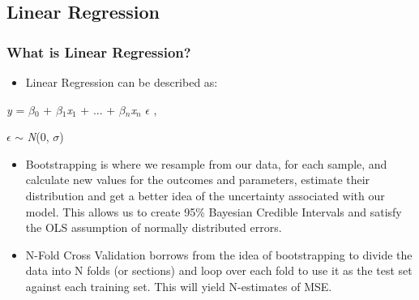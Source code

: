 \documentclass{beamer}
\begin{document}
	\subsection{Linear Regression}
	\begin{frame}
		\frametitle{What is Linear Regression?}
		\begin{itemize}
			\item Linear Regression can be described as:  
		\end{itemize}
		\begin{center}
			\emph{y} = $\beta$$_{0}$ + $\beta$$_{1}$\emph{x}$_{1}$ + ... + $\beta$$_{n}$\emph{x}$_{n}$ $\epsilon$ ,   \par
			$\epsilon$ $\sim$ \emph{N}(0, $\sigma$)   \par
		\end{center}
	\begin{itemize}
		\item Bootstrapping is where we resample from our data, for each sample, and calculate new values for the outcomes and parameters, estimate their distribution and get a better idea of the uncertainty associated with our model.  This allows us to create 95\% Bayesian Credible Intervals and satisfy the OLS assumption of normally distributed errors. 
		\item N-Fold Cross Validation borrows from the idea of bootstrapping to divide the data into N folds (or sections) and loop over each fold to use it as the test set against each training set.  This will yield N-estimates of MSE.  
	\end{itemize}
	\end{frame}
	
\end{document}
